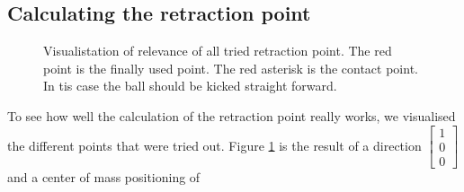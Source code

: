 \documentclass[a4paper]{article}
\begin{document}
\subsection{Calculating the retraction point}
\begin{figure}[htbp]
  \centering
  \caption{Visualistation of relevance of all tried retraction point. The red
      point is the finally used point. The red asterisk is the contact point. In
      tis case the ball should be kicked straight forward.
         }
  \label{fig:retraction_plot1}
\end{figure}
\FloatBarrier
To see how well the calculation of the retraction point really works, we
visualised the different points that were tried out. Figure \ref{fig:retraction_plot1}
is the result of a direction 
$\begin{bmatrix} 1 \\  0 \\ 0 \end{bmatrix}$ and a center of mass positioning of
\end{document}
